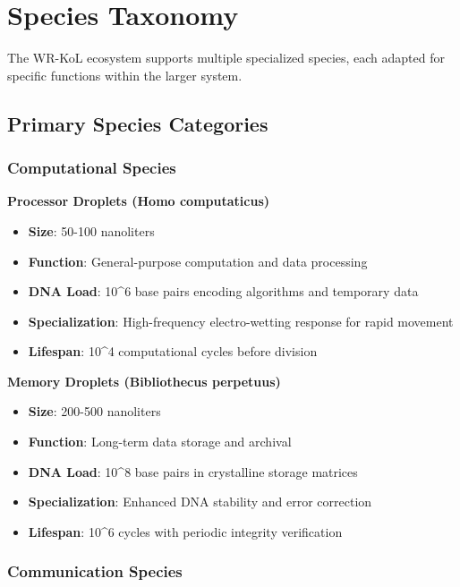 \documentclass[11pt,a4paper]{article}
\begin{document}
\section{Species Taxonomy}

The WR-KoL ecosystem supports multiple specialized species, each adapted for specific functions within the larger system.

\subsection{Primary Species Categories}

\subsubsection{Computational Species}

\textbf{Processor Droplets (Homo computaticus)}
\begin{itemize}
    \item \textbf{Size}: 50-100 nanoliters
    \item \textbf{Function}: General-purpose computation and data processing
    \item \textbf{DNA Load}: 10\^{}6 base pairs encoding algorithms and temporary data
    \item \textbf{Specialization}: High-frequency electro-wetting response for rapid movement
    \item \textbf{Lifespan}: 10\^{}4 computational cycles before division
\end{itemize}

\textbf{Memory Droplets (Bibliothecus perpetuus)}
\begin{itemize}
    \item \textbf{Size}: 200-500 nanoliters
    \item \textbf{Function}: Long-term data storage and archival
    \item \textbf{DNA Load}: 10\^{}8 base pairs in crystalline storage matrices
    \item \textbf{Specialization}: Enhanced DNA stability and error correction
    \item \textbf{Lifespan}: 10\^{}6 cycles with periodic integrity verification
\end{itemize}

\subsubsection{Communication Species}
\end{document}
